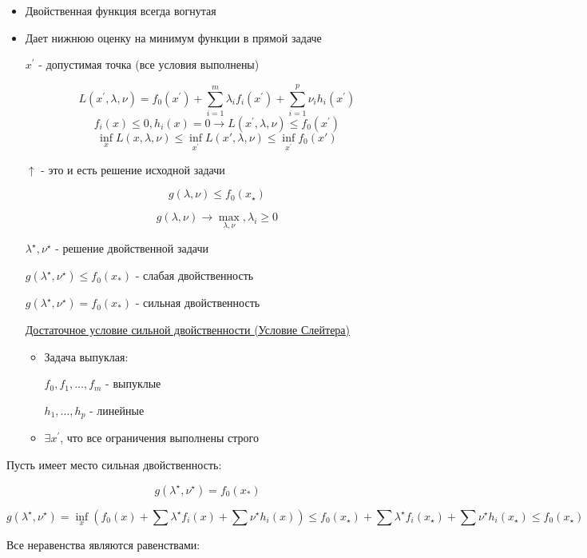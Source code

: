 \documentclass[a4paper, 12pt]{article}
\begin{document}
\begin{itemize}
    \item Двойственная функция всегда вогнутая
    \item Дает нижнюю оценку на минимум функции в прямой задаче
    
    \(x^{\prime}\) - допустимая точка (все условия выполнены)

    \[L(x^{\prime}, \lambda, \nu) = f_0(x^{\prime}) + 
    \sum_{i = 1}^m \lambda_i f_i(x^{\prime}) + \sum_{i = 1}^p \nu_i h_i(x^{\prime})\]
    \[f_i(x) \leq 0, h_i(x) = 0 \rightarrow 
    L(x^{\prime}, \lambda, \nu) \leq f_0(x^{\prime})\]
    \[\inf_x L(x, \lambda, \nu) \leq \inf_{x^{\prime}} 
    L(x', \lambda, \nu) \leq \inf_{x^{\prime}} f_0(x')\]

    $\uparrow$ - это и есть решение исходной задачи

    \[g(\lambda, \nu) \leq f_0(x_{\star})\]

    \[g(\lambda, \nu) \rightarrow \max_{\lambda, \nu}, \lambda_i \geq 0\]

    \(\lambda^{\star}, \nu^{\star}\) - решение двойственной задачи

    \(g(\lambda^{\star}, \nu^{\star}) \leq f_0(x_{*})\) - слабая двойственность

    \(g(\lambda^{\star}, \nu^{\star}) = f_0(x_{*})\) - сильная двойственность

    \underline{Достаточное условие сильной двойственности (Условие Слейтера)}

    \begin{itemize}
        \item Задача выпуклая:
        
        \(f_0, f_1, \ldots, f_m\) - выпуклые

        \(h_1, \ldots, h_p\) - линейные
        \item \(\exists x^{\prime}\), что все ограничения выполнены строго
    \end{itemize}
\end{itemize}

Пусть имеет место сильная двойственность:

\[g(\lambda^{\star}, \nu^{\star}) = f_0(x_{*})\]

\[g(\lambda^{\star}, \nu^{\star}) = \inf_x(f_0(x) + 
\sum \lambda^{\star} f_i(x) + \sum \nu^{\star} h_i(x))
\leq f_0(x_{\star}) + 
\sum \lambda^{\star} f_i(x_{\star}) + \sum \nu^{\star} h_i(x_{\star}) 
\leq f_0(x_{\star})\]

Все неравенства являются равенствами:
\end{document}
